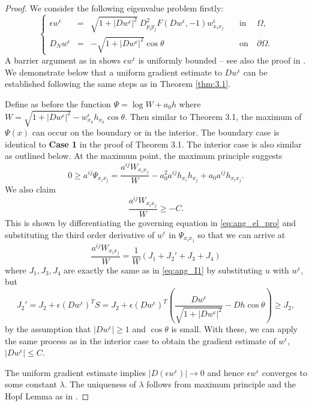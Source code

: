 \documentclass[12pt]{article}
\numberwithin{equation}{section}
\theoremstyle{plain}
\theoremstyle{definition}
\theoremstyle{remark}
\begin{document}
\begin{proof}
We consider the following eigenvalue problem firstly: 
\begin{equation} \label{eq:ang_el_eigpro}
\left\{ \begin{array}{cllcl}
     \epsilon w^{\epsilon} & = & \sqrt{1+|Dw^{\epsilon}|^2} \ D^2_{p_i p_j} F (Dw^{\epsilon},-1) w^{\epsilon}_{x_i x_j}    \quad & \text{in} & \ \Omega,  \\
     D_N w^{\epsilon} & = & - \sqrt{1+|Dw^{\epsilon}|^2} \cos \theta \quad & \text{on} & \ \partial \Omega.
\end{array} \right.
\end{equation}
A barrier argument as in \cite{AW2} shows $\epsilon w^{\epsilon}$ is uniformly bounded -- see also the proof in \cite{GMWW}. We demonstrate below that a uniform gradient estimate to $D w^{\epsilon}$ can be established following the same steps as in Theorem \ref{thm:3.1}.  

Define as before the function $\Psi = \log W + a_0h$
where  $W = \sqrt{1+|Dw^{\epsilon}|^2} - w^{\epsilon}_{x_k} h_{x_k} \cos \theta $. Then similar to Theorem 3.1, the maximum of $\Psi(x)$ can occur on the boundary or in the interior. The boundary case is identical to {\bf Case 1} in the proof of Theorem 3.1. The interior case is also similar as outlined below.
At the maximum point, the maximum principle suggests 
\begin{equation*}
    0 \geq a^{ij} \Psi_{x_i x_j} = \frac{a^{ij} W_{x_i x_j}}{W}  - a_0^2 a^{ij} h_{x_i} h_{x_j} + a_0 a^{ij} h_{x_i x_j}.
\end{equation*}
We also claim 
\begin{equation*}
    \frac{a^{ij} W_{x_i x_j}}{W} \geq -C.
\end{equation*}
This is shown by differentiating the governing equation in \eqref{eq:ang_el_pro}
and substituting the third order derivative of $w^{\epsilon}$ in $\Psi_{x_i x_j}$
so that we can arrive at
\begin{equation*}
    \frac{a^{ij} W_{x_i x_j}}{W} = \frac{1}{W} (J_1 + J_2' + J_3 + J_4)
\end{equation*}
where $J_1, J_3, J_4$ are exactly the same as in \eqref{eq:ang_I1} by substituting $u$ with $w^{\epsilon}$, but 
\begin{equation*}
    J_2' = J_2 + \epsilon (Dw^{\epsilon})^T S
    =J_2 + \epsilon (Dw^{\epsilon})^T\left(\frac{Dw^\epsilon}{\sqrt{1+|Dw^\epsilon|^2}}-Dh\cos\theta\right)\geq J_2,
\end{equation*}
by the assumption that $|Dw^{\epsilon}| \geq 1$ and $\cos\theta$ is small. With these, we can apply the same process as in the interior case to obtain the gradient estimate of $w^{\epsilon}$, $|Dw^\epsilon| \leq C$.

The uniform gradient estimate implies $|D(\epsilon w^{\epsilon})| \rightarrow 0$ 
and hence $\epsilon w^{\epsilon}$ converges to some constant $\lambda$. 
The uniqueness of $\lambda$ follows from maximum principle and the Hopf Lemma as in \cite{AW1}.
\end{proof}
\end{document}
